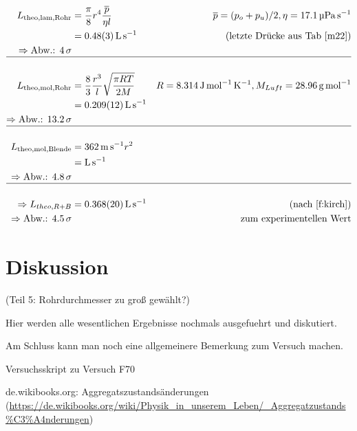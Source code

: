 \documentclass[12pt, a4paper]{scrartcl}
\begin{document}
        \begin{align}
        	L_{\text{theo,lam,Rohr}}&=\frac{\pi}{8} r^4 \frac{\overline p}{\eta l}&\overline p = (p_o+p_u)/2, \eta= 
        	\SI{17.1}{\micro\pascal\per\second}\\
        	&= \SI{0.48+-0.03}{\litre\per\second} &\text{(letzte Drücke aus Tab \ref{m22})}\\
        	\Rightarrow \text{Abw.: } \SI{4}{\sigma}\\
        	\hline\nonumber\\
        	L_{\text{theo,mol,Rohr}}&=\frac 8 3 \frac{r^3}{l} \sqrt{\frac{\pi R T}{2 M}} &R=\SI{8.314}{\joule\per\mole\per\kelvin}, M_{Luft} = \SI{28.96}{\gram\per\mole}\\
        	&=\SI{.209+-.012}{\litre\per\second}\\
        	\Rightarrow \text{Abw.: } \SI{13.2}{\sigma}\\
        	\hline\nonumber\\
        	L_{\text{theo,mol,Blende}}
        	&=\SI{362}{\meter\per\second} r^2\\
        	&=\SI{}{\litre\per\second}\\
        	\Rightarrow \text{Abw.: } \SI{4.8}{\sigma}\\
        	\hline\nonumber\\
        	\Rightarrow L_{theo,R+B} 
        	&= \SI{.368+-.02}{\litre\per\second}
        	&(\text{nach }\ref{f:kirch})\\
        	\Rightarrow \text{Abw.: \SI{4.5}{\sigma}}&&\text{zum experimentellen Wert}
        \end{align}
        
	
	\section{Diskussion}
    
    (Teil 5: Rohrdurchmesser zu groß gewählt?)
	
	Hier werden alle wesentlichen Ergebnisse nochmals ausgefuehrt und diskutiert. 
	
	Am Schluss kann man noch eine allgemeinere Bemerkung zum Versuch machen.
	
	
	\newpage 
	
	\begin{thebibliography}{00}   %
		
		 Versuchsskript zu Versuch F70
		
		 de.wikibooks.org: Aggregatszustandsänderungen\\ (\url{https://de.wikibooks.org/wiki/Physik_in_unserem_Leben/_Aggregatzustands%C3%A4nderungen})
		
	\end{thebibliography}
	
\end{document}
